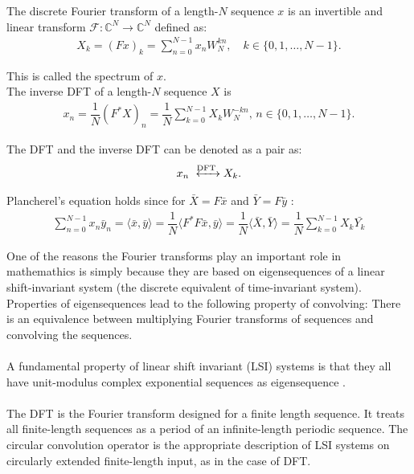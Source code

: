 \begin{definition}
The discrete Fourier transform of a length-$N$ sequence $x$ is an invertible and linear transform $\mathcal{F}: \mathbb{C}^N \to \mathbb{C}^N$ defined as:
\begin{align} \label{eq:def_DFT}
	X_k = (Fx)_k = \sum_{n=0}^{N-1} x_n W_N^{kn}, \quad k\in \{0, 1, \dots, N-1\}.
\end{align}

This is called the spectrum of $x$. \\
The inverse DFT of a length-$N$ sequence $X$ is
\begin{align*}
	x_n = \dfrac{1}{N}(F^*X)_n = \dfrac{1}{N}\sum_{k=0}^{N-1} X_k W_N^{-kn}, \, n \in \{0,1,\dots,N-1\}.
\end{align*}

The DFT and the inverse DFT can be denoted as a pair as:
\begin{align*}
	x_n \xleftrightarrow{\text{DFT}} X_k.
\end{align*}
\end{definition}

Plancherel's equation holds since for $\bar{X} = F\bar{x}$ and $\bar{Y} = F\bar{y}$ :
\begin{align*}
\sum_{n=0}^{N-1} x_n \bar{y}_n = \langle \bar{x},\bar{y} \rangle = \dfrac{1}{N} \langle F^*F\bar{x},\bar{y} \rangle = \dfrac{1}{N} \langle \bar{X},\bar{Y} \rangle = \dfrac{1}{N} \sum_{k=0}^{N-1} X_k \bar{Y_k}
\end{align*}

One of the reasons the Fourier transforms play an important role in mathemathics is simply because they are based on eigensequences of a linear shift-invariant system (the discrete equivalent of time-invariant system).
Properties of eigensequences lead to the following property of convolving:
There is an equivalence between multiplying Fourier transforms of sequences and convolving the sequences.
\\\\
 A fundamental property of linear shift invariant (LSI) systems is that they all have unit-modulus complex exponential sequences as eigensequence \cite{FSP}.
\\\\
The DFT is the Fourier transform designed for a finite length sequence.
It treats all finite-length sequences as a period of an infinite-length periodic sequence.
The circular convolution operator is the appropriate description of LSI systems on circularly extended finite-length input, as in the case of DFT. 

